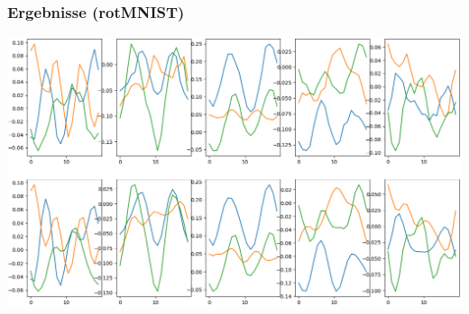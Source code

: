 \begin{frame}
	\frametitle{Ergebnisse (rotMNIST)}
	\includegraphics[scale=0.3]{Bilder/SDE_rotMNIST_latent_three_rec}
\end{frame}














